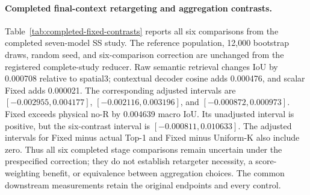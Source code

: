 \documentclass[10pt]{article}
\begin{document}
\paragraph{Completed final-context retargeting and aggregation contrasts.}
Table~\ref{tab:completed-fixed-contrasts} reports all six comparisons from
the completed seven-model SS study. The reference
population, 12,000 bootstrap draws, random seed, and six-comparison correction
are unchanged from the registered complete-study reducer. Raw semantic
retrieval changes IoU by 0.000708 relative to spatial3; contextual decoder
cosine adds 0.000476, and scalar Fixed adds 0.000021. The corresponding
adjusted intervals are $[-0.002955,0.004177]$,
$[-0.002116,0.003196]$, and $[-0.000872,0.000973]$.
Fixed exceeds physical no-R by 0.004639 macro IoU. Its unadjusted interval
is positive, but the six-contrast interval is $[-0.000811,0.010633]$.
The adjusted intervals for Fixed minus actual Top-1 and Fixed minus Uniform-K
also include zero. Thus all six completed stage comparisons remain uncertain
under the prespecified correction; they do not establish
retargeter necessity, a score-weighting benefit, or equivalence between
aggregation choices. The common downstream measurements retain the original
endpoints and every control.

\end{document}
